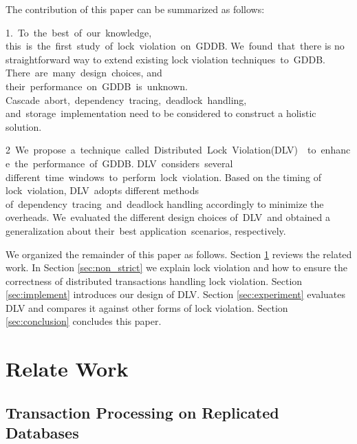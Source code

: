 \documentclass[conference]{IEEEtran}
\begin{document}
The contribution of this paper can be summarized as follows:
\begin{highlighted}
  

1. To the best of our knowledge, this is the first study of lock violation on GDDB.
We found that there is no straightforward way to extend existing lock violation techniques to GDDB. 
There are many design choices, and their performance on GDDB is unknown. 
Cascade abort, dependency tracing, deadlock handling, and storage implementation need to be considered to construct a holistic solution.  

2 We propose a technique called Distributed Lock Violation(DLV)  to enhance the performance of GDDB.
DLV considers several different time windows to perform lock violation.
Based on the timing of lock violation, DLV adopts different methods of dependency tracing and deadlock handling accordingly to minimize the overheads.
We evaluated the different design choices of DLV and obtained a generalization about their best application scenarios, respectively.
\end{highlighted}

We organized the remainder of this paper as follows.
Section \ref{sec:relate_work} reviews the related work.
In Section \ref{sec:non_strict} we explain lock violation and how to ensure the correctness of distributed transactions handling lock violation.
Section \ref{sec:implement} introduces our design of DLV.
Section \ref{sec:experiment} evaluates DLV and compares it against other forms of lock violation.
Section \ref{sec:conclusion} concludes this paper.


\section{Relate Work}
\label{sec:relate_work}

\subsection{Transaction Processing on Replicated Databases}
\end{document}

